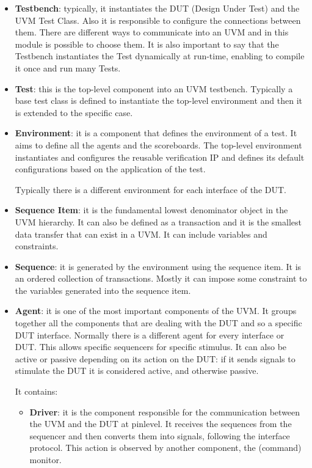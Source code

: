 \begin{itemize}
    \item \textbf{Testbench}: typically, it instantiates the DUT (Design Under Test) and the UVM Test Class. Also it is responsible to configure the connections between them.
    There are different ways to communicate into an UVM and in this module is possible to choose them.
    It is also important to say that the Testbench instantiates the Test dynamically at run-time, enabling to compile it once and run many Tests.
    
    \item \textbf{Test}: this is the top-level component into an UVM testbench.
    Typically a base test class is defined to instantiate the top-level environment and then it is extended to the specific case.
    
    \item \textbf{Environment}: it is a component that defines the environment of a test. It aims to define all the agents and the scoreboards. 
    The top-level environment instantiates and configures the reusable verification IP and defines its default configurations based on the application of the test.
    
    Typically there is a different environment for each interface of the DUT.
    
    \item \textbf{Sequence Item}: it is the fundamental lowest denominator object in the UVM hierarchy. It can also be defined as a transaction and it is the smallest data transfer that can exist in a UVM. It can include variables and constraints.
    
    \item \textbf{Sequence}: it is generated by the environment using the sequence item. It is an ordered collection of transactions.
    Mostly it can impose some constraint to the variables generated into the sequence item.
    
    \item \textbf{Agent}: it is one of the most important components of the UVM. It groups together all the components that are dealing with the DUT and so a specific DUT interface.
    Normally there is a different agent for every interface or DUT. This allows specific sequencers for specific stimulus.
    It can also be active or passive depending on its action on the DUT: if it sends signals to stimulate the DUT it is considered active, and otherwise passive.
    
    It contains:
    \begin{itemize}
        \item \textbf{Driver}: it is the component responsible for the communication between the UVM and the DUT at pinlevel. It receives the sequences from the sequencer and then converts them into signals, following the interface protocol.
        This action is observed by another component, the (command) monitor.
        

\end{itemize}
\end{itemize}
